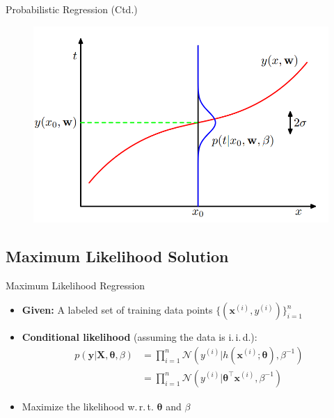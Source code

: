 \begin{frame}{Probabilistic Regression (Ctd.)}{}
	\vspace*{-2mm}
	\begin{figure}
		\includegraphics[scale=0.35]{05_regression/02_img/probabilistic_regression}
	\end{figure}
	\begin{center}
	\end{center}
\end{frame}


\subsection{Maximum Likelihood Solution}

\begin{frame}{Maximum Likelihood Regression}{}
	\begin{itemize}
		\item \textbf{Given:} A labeled set of training data points $\{ (\bm{x}^{(i)}, y^{(i)}) \}_{i=1}^n$
		\item \textbf{Conditional likelihood} (assuming the data is i.\,i.\,d.):
		\begin{align}
			p(\bm{y} \vert \bm{X}, \bm{\theta}, \beta)
				&= \prod_{i=1}^n \mathcal{N}(y^{(i)} \vert h(\bm{x}^{(i)}; \bm{\theta}), \beta^{-1}) \\
				&= \prod_{i=1}^n \mathcal{N}(y^{(i)} \vert \bm{\theta}^{\intercal}\bm{x}^{(i)}, \beta^{-1})
		\end{align}
		\item Maximize the likelihood w.\,r.\,t. $\bm{\theta}$ and $\beta$
	\end{itemize}
\end{frame}



